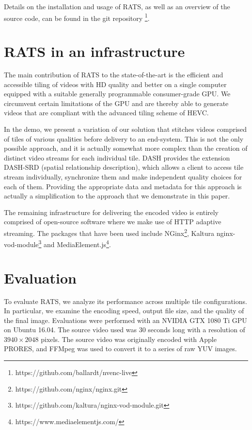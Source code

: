 Details on the installation and usage of RATS, as well as an overview of the source code, can be found in the git repository \footnote{https://github.com/ballardt/nvenc-live}.

\section{RATS in an infrastructure} \label{infra}

The main contribution of RATS to the state-of-the-art is the efficient and accessible
tiling of videos with HD quality and better on a single computer equipped with a
suitable generally programmable consumer-grade GPU.
We circumvent certain limitations of the GPU and are thereby able to generate videos
that are compliant with the advanced tiling scheme of HEVC.

In the demo, we present
a variation of our solution that stitches videos comprised of tiles of various
qualities before delivery to an end-system.
This is not the only possible approach, and it is actually somewhat more complex
than the creation of distinct video streams for each individual tile.
DASH provides the extension DASH-SRD (spatial relationship description), which
allows a client to access tile stream individually, synchronize them and make
independent quality choices for each of them. Providing the appropriate data and
metadata for this approach is actually a simplification to the approach that we
demonstrate in this paper.

The remaining infrastructure for delivering the encoded video is entirely comprised
of open-source software where we make use of HTTP adaptive streaming.
The packages that have been used include NGinx\footnote{https://github.com/nginx/nginx.git}, Kaltura nginx-vod-module\footnote{https://github.com/kaltura/nginx-vod-module.git} and MediaElement.js\footnote{https://www.mediaelementjs.com/}.



\section{Evaluation} \label{eval}
To evaluate RATS, we analyze its performance across multiple tile configurations. In particular, we examine the encoding speed, output file size, and the quality of the final image. Evaluations were performed with an NVIDIA GTX 1080 Ti GPU on Ubuntu 16.04. The source video used was 30 seconds long with a resolution of $3940\times2048$ pixels. The source video was originally encoded with Apple PRORES, and FFMpeg was used to convert it to a series of raw YUV images.

